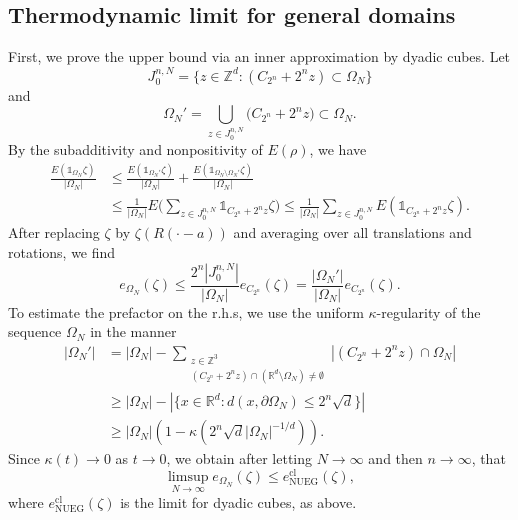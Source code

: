 \documentclass[final,onefignum,onetabnum,reqno]{amsart}
\theoremstyle{remark}
\renewcommand{\le}{\leqslant}
\renewcommand{\ge}{\geqslant}
\newcommand{\RR}{\mathbb{R}}
\newcommand{\ZZ}{\mathbb{Z}}
\newcommand{\cl}{\mathrm{cl}} %
\newcommand{\NUEG}{\mathrm{NUEG}} %
\newcommand{\iden}{\mathbb{1}} %
\begin{document}
\subsection{Thermodynamic limit for general domains}
First, we prove the upper bound via an inner approximation by dyadic cubes. Let 
$$
J_0^{n,N}=\{z\in\ZZ^d : (C_{2^{n}} + 2^n z) \subset \Omega_N\}
$$ 
and 
$$
\Omega_N'=\bigcup_{z\in J_0^{n,N}} \bigl(C_{2^{n}} + 2^n z\bigr)\subset \Omega_N.
$$
By the subadditivity and nonpositivity of $E(\rho)$, we have
\begin{align*}
\frac{E(\iden_{\Omega_N}\zeta)}{|\Omega_N|}&\le \frac{E(\iden_{\Omega_N'}\zeta)}{|\Omega_N|}+\frac{E(\iden_{\Omega_N\setminus\Omega_N'}\zeta)}{|\Omega_N|}\\
&\le\frac{1}{|\Omega_N|} E\Biggl( \sum_{z\in J_0^{n,N}} \iden_{C_{2^{n}} + 2^n z} \zeta \Biggr)\le \frac{1}{|\Omega_N|} \sum_{z\in J_0^{n,N}} E(\iden_{C_{2^{n}} + 2^n z} \zeta).
\end{align*}
After replacing $\zeta$ by $\zeta(R(\cdot-a))$ and averaging over all translations and rotations, we find
$$
e_{\Omega_N}(\zeta)\le \frac{2^n|J_0^{n,N}|}{|\Omega_N|} e_{C_{2^n}}(\zeta)=\frac{|\Omega_N'|}{|\Omega_N|}e_{C_{2^n}}(\zeta).
$$
To estimate the prefactor on the r.h.s, we use the uniform $\kappa$-regularity of the sequence $\Omega_N$ in the manner
\begin{align*}
|\Omega_N'|&=|\Omega_N| - \sum_{\substack{z\in\ZZ^3\\(C_{2^{n}} + 2^n z)\cap (\RR^d\setminus\Omega_N)\neq \emptyset}} |(C_{2^{n}} + 2^n z)\cap\Omega_N|\\
&\ge |\Omega_N| - |\{x\in\RR^d : d(x,\partial\Omega_N)\le 2^{n}\sqrt{d}\}|\\
&\ge |\Omega_N|\left(1 - \kappa(2^n\sqrt{d}|\Omega_N|^{-1/d})\right).
\end{align*}
Since $\kappa(t)\to 0$ as $t\to 0$, we obtain after letting $N\to\infty$ and then $n\to\infty$, that 
$$
\limsup_{N\to\infty} e_{\Omega_N}(\zeta)\le e_\NUEG^\cl(\zeta),
$$
where $e_\NUEG^\cl(\zeta)$ is the limit for dyadic cubes, as above.
\end{document}
